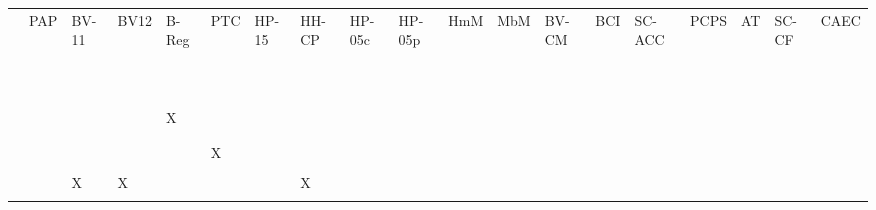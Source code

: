 \documentclass[11pt,a4paper]{book}
\theoremstyle{definition}
\theoremstyle{definition}
\theoremstyle{definition}
\theoremstyle{remark}
\begin{document}
 \begin{table}
\centering
\tiny
\begin{tabular}{lp{0.4cm}p{0.4cm}p{0.4cm}p{0.4cm}p{0.4cm}p{0.4cm}p{0.4cm}p{0.4cm}p{0.4cm}p{0.4cm}p{0.4cm}p{0.4cm}p{0.4cm}p{0.4cm}p{0.4cm}p{0.4cm}p{0.4cm}p{0.4cm}}
\toprule
 & PAP	 & BV-11	 & BV12	 & B-Reg	 & PTC	 & HP-15	 & HH-CP	 & HP-05c	 & HP-05p	 & HmM	 & MbM	 & BV-CM	 & BCI	 & SC-ACC	 & PCPS	 & AT	 & SC-CF	 & CAEC	\\
\cite{vennekens2010embracing} 	& 	& 	& 	& 	& 	& 	& 	& 	& 	& 	& 	& 	& 	& 	& 	& 	& 	& 	\\
 \cite{bex2010hybrid} 	& 	& 	& 	& 	& 	& 	& 	& 	& 	& 	& 	& 	& 	& 	& 	& 	& 	& 	\\
 \cite{lee2010representing}	& 	& 	& 	& 	& 	& 	& 	& 	& 	& 	& 	& 	& 	& 	& 	& 	& 	& 	\\
 \cite{lifschitz2010translating} 	& 	& 	& 	& 	& 	& 	& 	& 	& 	& 	& 	& 	& 	& 	& 	& 	& 	& 	\\
 \cite{glymour2010actual}	& 	& 	& 	& 	& 	& 	& 	& 	& 	& 	& 	& 	& 	& 	& 	& 	& 	& 	\\
 \cite{claassen2010causal} 	& 	& 	& 	& 	& 	& 	& 	& 	& 	& 	& 	& 	& 	& 	& 	& 	& 	& 	\\
 \cite{gerstenberg2010spreading}	& 	& 	& 	& 	& 	& 	& 	& 	& 	& 	& 	& 	& 	& 	& 	& 	& 	& 	\\
 \cite{halpern2011actual} 	& 	& 	& 	& 	& 	& 	& 	& 	& 	& 	& 	& 	& 	& 	& 	& 	& 	& 	\\
 \cite{shulz2011if} 	& 	& 	& 	& 	& 	& 	& 	& 	& 	& 	& 	& 	& 	& 	& 	& 	& 	& 	\\
 \cite{briggs2012interventionist}	& 	& 	& 	& 	& 	& 	& 	& 	& 	& 	& 	& 	& 	& 	& 	& 	& 	& 	\\
 \cite{baumgartner2013regularity} 	& 	& 	& 	& X	& 	& 	& 	& 	& 	& 	& 	& 	& 	& 	& 	& 	& 	& 	\\
 \cite{hyttinen2013discovering} 	& 	& 	& 	& 	& 	& 	& 	& 	& 	& 	& 	& 	& 	& 	& 	& 	& 	& 	\\
 \cite{halpern2015graded} 	& 	& 	& 	& 	& 	& 	& 	& 	& 	& 	& 	& 	& 	& 	& 	& 	& 	& 	\\
 \cite{weslake2015partial} 	& 	& 	& 	& 	& X	& 	& 	& 	& 	& 	& 	& 	& 	& 	& 	& 	& 	& 	\\
 \cite{chockler2015causal}  	& 	& 	& 	& 	& 	& 	& 	& 	& 	& 	& 	& 	& 	& 	& 	& 	& 	& 	\\
 \cite{beckers2016general} 	& 	& X	& X	& 	& 	& 	& X	& 	& 	& 	& 	& 	& 	& 	& 	& 	& 	& 	\\
 \cite{schaffer2016grounding}  	& 	& 	& 	& 	& 	& 	& 	& 	& 	& 	& 	& 	& 	& 	& 	& 	& 	& 	\\

\end{tabular}
\end{table}
\end{document}
